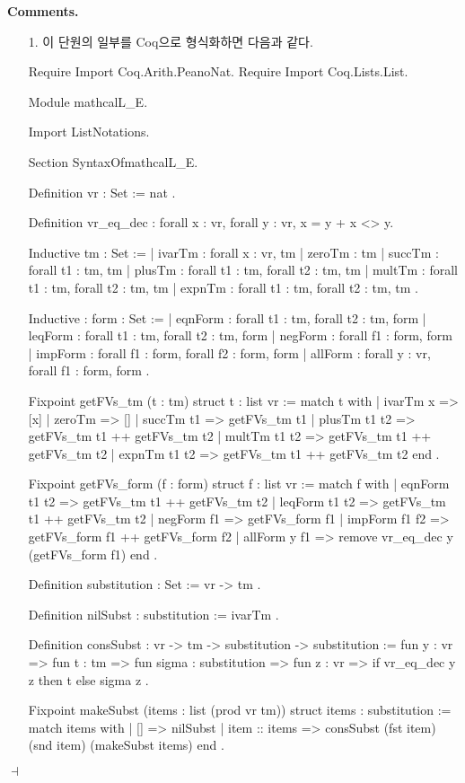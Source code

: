\documentclass[12pt]{paper}
\newenvironment{context}[1][]
{ \noindent \textbf{{#1}.}
}
{ \hfill $ \dashv $
}
\begin{document}
  \begin{context}[Comments]
    \begin{enumerate}
      \item[{1.}] 이 단원의 일부를 Coq으로 형식화하면 다음과 같다.
\begin{coqcode}
Require Import Coq.Arith.PeanoNat.
Require Import Coq.Lists.List.

Module mathcalL_E.

  Import ListNotations.

  Section SyntaxOfmathcalL_E.

  Definition vr : Set :=
    nat
  .

  Definition vr_eq_dec :
    forall x : vr,
    forall y : vr,
    {x = y} + {x <> y}.

  Inductive tm : Set :=
  | ivarTm : forall x : vr, tm
  | zeroTm : tm
  | succTm : forall t1 : tm, tm
  | plusTm : forall t1 : tm, forall t2 : tm, tm
  | multTm : forall t1 : tm, forall t2 : tm, tm
  | expnTm : forall t1 : tm, forall t2 : tm, tm
  .

  Inductive : form : Set :=
  | eqnForm : forall t1 : tm, forall t2 : tm, form
  | leqForm : forall t1 : tm, forall t2 : tm, form
  | negForm : forall f1 : form, form
  | impForm : forall f1 : form, forall f2 : form, form
  | allForm : forall y : vr, forall f1 : form, form
  .

  Fixpoint getFVs_tm (t : tm) {struct t} : list vr :=
    match t with
    | ivarTm x => [x]
    | zeroTm => []
    | succTm t1 => getFVs_tm t1
    | plusTm t1 t2 => getFVs_tm t1 ++ getFVs_tm t2
    | multTm t1 t2 => getFVs_tm t1 ++ getFVs_tm t2
    | expnTm t1 t2 => getFVs_tm t1 ++ getFVs_tm t2
    end
  .

  Fixpoint getFVs_form (f : form) {struct f} : list vr :=
    match f with
    | eqnForm t1 t2 => getFVs_tm t1 ++ getFVs_tm t2
    | leqForm t1 t2 => getFVs_tm t1 ++ getFVs_tm t2
    | negForm f1 => getFVs_form f1
    | impForm f1 f2 => getFVs_form f1 ++ getFVs_form f2
    | allForm y f1 => remove vr_eq_dec y (getFVs_form f1)
    end
  .

  Definition substitution : Set :=
    vr -> tm
  .

  Definition nilSubst : substitution :=
    ivarTm
  .

  Definition consSubst : vr -> tm -> substitution -> substitution :=
    fun y : vr =>
    fun t : tm =>
    fun sigma : substitution =>
    fun z : vr =>
    if vr_eq_dec y z
    then t
    else sigma z
  .

  Fixpoint makeSubst (items : list (prod vr tm)) {struct items} : substitution :=
    match items with
    | [] => nilSubst
    | item :: items => consSubst (fst item) (snd item) (makeSubst items)
    end
  .


\end{coqcode}
\end{enumerate}
\end{context}
\end{document}
